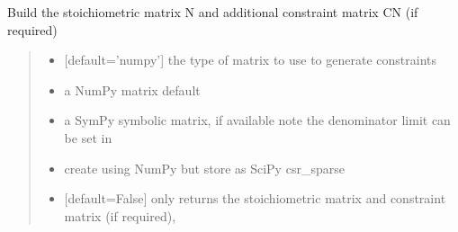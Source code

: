 \documentclass[letterpaper,12pt,english]{sphinxmanual}
\begin{document}
\begin{fulllineitems}
\begin{fulllineitems}
\label{\detokenize{api/core:cbmpy.CBModel.Model.buildStoichMatrix}}
\pysigstartsignatures
\pysiglinewithargsret
{}
{\sphinxparamcomma {}}
{}
\pysigstopsignatures
\sphinxAtStartPar
Build the stoichiometric matrix N and additional constraint matrix CN (if required)
\begin{quote}\begin{description}
\begin{itemize}
\item {} 
\sphinxAtStartPar
{} \textendash{} {[}default=’numpy’{]} the type of matrix to use to generate constraints

\item {} 
\sphinxAtStartPar
{} \textendash{} a NumPy matrix default

\item {} 
\sphinxAtStartPar
{} \textendash{} a SymPy symbolic matrix, if available note the denominator limit can be set in 

\item {} 
\sphinxAtStartPar
{} \textendash{} create using NumPy but store as SciPy csr\_sparse

\item {} 
\sphinxAtStartPar
{} \textendash{} {[}default=False{]}  only returns the stoichiometric matrix and constraint matrix (if required),

\end{itemize}

\end{description}\end{quote}

\end{fulllineitems}



\end{fulllineitems}
\end{document}
